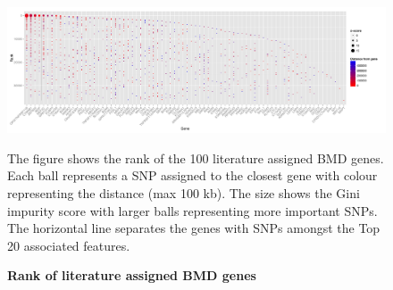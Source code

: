 \documentclass[10pt,letterpaper]{article}
\begin{document}
\begin{figure}[tbhp]
  \begin{adjustwidth}{-2.00in}{0in}
    \caption{\textbf{Rank of literature assigned BMD genes}}
    \label{figure:knowngeneranks}
    \includegraphics[totalheight=6.5cm]{./figs/BMDgenes_landscape.pdf}
    \begin{flushleft}
      The figure shows the rank of the 100 literature assigned BMD genes. Each ball represents a SNP assigned to the closest gene with colour representing the distance (max 100 kb). The size shows the Gini impurity score with larger balls representing more important SNPs. The horizontal line separates the genes with SNPs amongst the Top 20 associated features. 
     \end{flushleft}
  \end{adjustwidth}
\end{figure}
\end{document}
